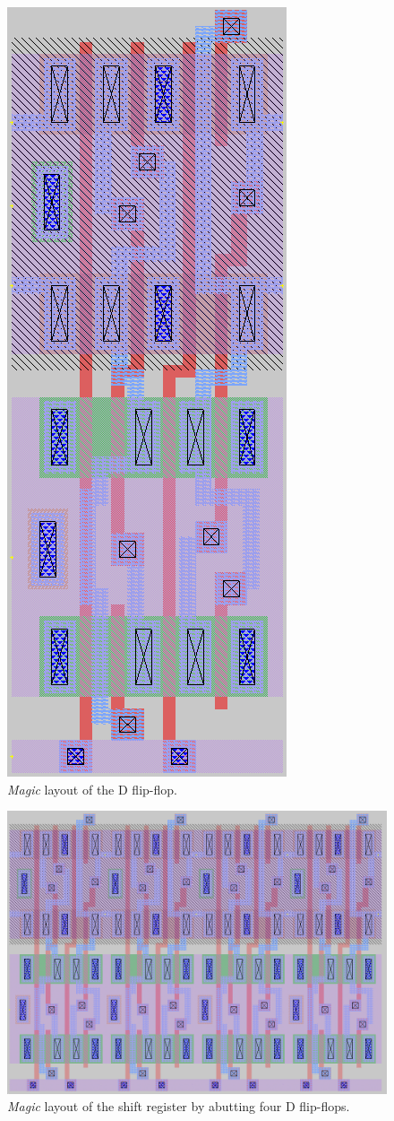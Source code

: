 \documentclass[11pt]{article}
\begin{document}
    \begin{figure}[!ht]
        \centering
        \includegraphics[width=0.3\linewidth]{../img/dff_mag.png}
        \caption{\textit{Magic} layout of the D flip-flop.}
        \label{fig:dffmag}
    \end{figure}
    \begin{figure}[!ht]
        \centering
        \includegraphics[width=0.8\linewidth]{../img/shiftreg_4.png}
        \caption{\textit{Magic} layout of the shift register by abutting four D flip-flops.}
        \label{fig:sregmag}
    \end{figure}
\end{document}
